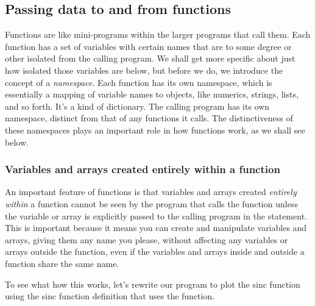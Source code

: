 \documentclass[letterpaper,10pt,english]{sphinxmanual}
\begin{document}
\subsection{Passing data to and from functions}
\label{chap7/chap7_funcs:passing-data-to-and-from-functions}
Functions are like mini-programs within the larger programs that call them.  Each function has a set of variables with certain names that are to some degree or other isolated from the calling program.  We shall get more specific about just how isolated those variables are below, but before we do, we introduce the concept of a \emph{namespace}.  Each function has its own namespace, which is essentially a mapping of variable names to objects, like numerics, strings, lists, and so forth.  It's a kind of dictionary.  The calling program has its own namespace, distinct from that of any functions it calls.  The distinctiveness of these namespaces plays an important role in how functions work, as we shall see below.


\subsubsection{Variables and arrays created entirely within a function}
\label{chap7/chap7_funcs:variables-and-arrays-created-entirely-within-a-function}
An important feature of functions is that variables and arrays created \emph{entirely within} a function cannot be seen by the program that calls the function unless the variable or array is explicitly passed to the calling program in the  statement.  This is important because it means you can create and manipulate variables and arrays, giving them any name you please, without affecting any variables or arrays outside the function, even if the variables and arrays inside and outside a function share the same name.

To see what how this works, let's rewrite our program to plot the sinc function using the sinc function definition that uses the  function.
\end{document}
